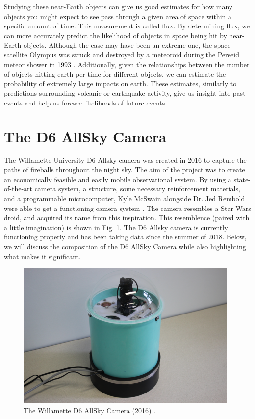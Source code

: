 Studying these near-Earth objects can give us good estimates for how many objects you might expect to see pass through a given area of space within a specific amount of time. 
This measurement is called flux.
By determining flux, we can more accurately predict the likelihood of objects in space being hit by near-Earth objects. 
Although the case may have been an extreme one, the space satellite Olympus was struck and destroyed by a meteoroid during the Perseid meteor shower in 1993 \cite{bobrowsky_comet/asteroid_nodate}.
Additionally, given the relationships between the number of objects hitting earth per time for different objects, we can estimate the probability of extremely large impacts on earth.
These estimates, similarly to predictions surrounding volcanic or earthquake activity, give us insight into past events and help us foresee likelihoods of future events.








\section{The D6 AllSky Camera}

The Willamette University D6 Allsky camera was created in 2016 to capture the paths of fireballs throughout the night sky. 
The aim of the project was to create an economically feasible and easily mobile observational system.
By using a state-of-the-art camera system, a structure, some necessary reinforcement materials, and a programmable microcomputer, Kyle McSwain alongside Dr. Jed Rembold were able to get a functioning camera system \cite{mcswain_using_2016}. 
The camera resembles a Star Wars droid, and acquired its name from this inspiration.
This resemblence (paired with a little imagination) is shown in Fig. \ref{droid}.
The D6 Allsky camera is currently functioning properly and has been taking data since the summer of 2018.  
Below, we will discuss the composition of the D6 AllSky Camera while also highlighting what makes it significant.

\begin{figure}[ht!]
  \centering
  \includegraphics[scale=0.7]{images/allsky_camera.png}
  \caption{The Willamette D6 AllSky Camera (2016) \cite{mcswain_using_2016}.}
  \label{droid}
\end{figure}

